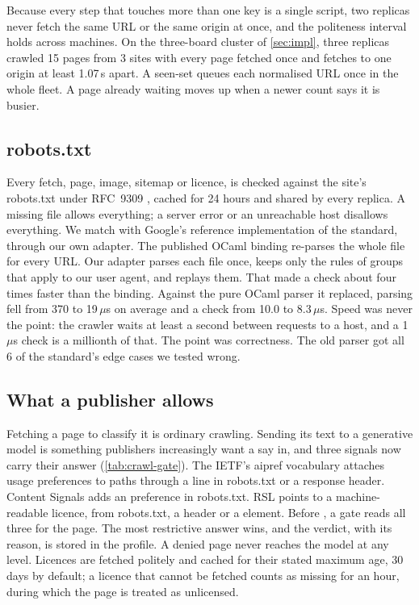 Because every step that touches more than one key is a single script, two replicas never fetch the same URL or the same origin at once, and the politeness interval holds across machines. On the three-board cluster of \cref{sec:impl}, three replicas crawled 15 pages from 3 sites with every page fetched once and fetches to one origin at least 1.07\,s apart. A seen-set queues each normalised URL once in the whole fleet. A page already waiting moves up when a newer count says it is busier.

\subsection{robots.txt}\label{sec:crawl-robots}

Every fetch, page, image, sitemap or licence, is checked against the site's robots.txt under RFC~9309 \citep{rfc9309}, cached for 24 hours and shared by every replica. A missing file allows everything; a server error or an unreachable host disallows everything. We match with Google's reference implementation of the standard, through our own adapter. The published OCaml binding re-parses the whole file for every URL. Our adapter parses each file once, keeps only the rules of groups that apply to our user agent, and replays them. That made a check about four times faster than the binding. Against the pure OCaml parser it replaced, parsing fell from 370 to 19\,$\mu$s on average and a check from 10.0 to 8.3\,$\mu$s. Speed was never the point: the crawler waits at least a second between requests to a host, and a 1\,$\mu$s check is a millionth of that. The point was correctness. The old parser got all 6 of the standard's edge cases we tested wrong.

\subsection{What a publisher allows}\label{sec:crawl-gate}

Fetching a page to classify it is ordinary crawling. Sending its text to a generative model is something publishers increasingly want a say in, and three signals now carry their answer (\cref{tab:crawl-gate}). The IETF's aipref vocabulary \citep{keller2026vocabulary} attaches usage preferences to paths through a  line in robots.txt or a response header. Content Signals adds an  preference in robots.txt. RSL \citep{rsl2025really} points to a machine-readable licence, from robots.txt, a  header or a  element. Before , a gate reads all three for the page. The most restrictive answer wins, and the verdict, with its reason, is stored in the profile. A denied page never reaches the model at any level. Licences are fetched politely and cached for their stated maximum age, 30 days by default; a licence that cannot be fetched counts as missing for an hour, during which the page is treated as unlicensed.

